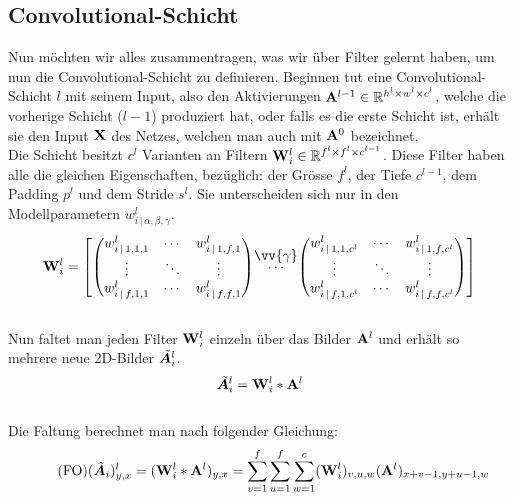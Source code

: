 \subsection{Convolutional-Schicht}
Nun möchten wir alles zusammentragen, was wir über Filter gelernt
haben, um nun die Convolutional-Schicht zu definieren.
\para{}
Beginnen tut eine Convolutional-Schicht $l$ mit seinem Input, also den
Aktivierungen $\mathbf{A}^{l-1} \in \mathbb{R}^{h^l \times w^l \times c^l}$, welche die vorherige Schicht ($l-1$) produziert hat,
oder falls es die erste Schicht ist, erhält sie den Input $\mathbf{X}$ des Netzes,
welchen man auch mit $\mathbf{A}^0$ bezeichnet. \\
Die Schicht besitzt $c^l$ Varianten an Filtern $\mathbf{W}^l_i \in
\mathbb{R}^{f^l \times f^l \times c^{l-1}}$. Diese Filter haben alle die gleichen
Eigenschaften, bezüglich: der Grösse $f^l$, der Tiefe $c^{l-1}$, dem Padding
$p^l$ und dem Stride $s^l$. Sie unterscheiden sich nur in den Modellparametern
$w^l_{i\,|\,\alpha,\beta,\gamma}$.
\\
\begin{equation*}
  \ten{W}^l_i =
  \begin{bmatrix}
    \begin{pmatrix}
      w_{i\,|\,1,1,1}^l & \cdots & w_{i\,|\,1,f,1}^l \\
      \vdots & \ddots & \vdots \\
      w_{i\,|\,f,1,1}^l & \cdots & w_{i\,|\,f,f,1}^l
    \end{pmatrix}
    & \stackrel{\mathclap{\normalfont\mbox{$\vv{\gamma}$}}}{\cdots} &
    \begin{pmatrix}
      w_{i\,|\,1,1,c^l}^l & \cdots & w_{i\,|\,1,f,c^l}^l \\
      \vdots & \ddots & \vdots \\
      w_{i\,|\,f,1,c^l}^l & \cdots & w_{i\,|\,f,f,c^l}^l
    \end{pmatrix}
  \end{bmatrix}
\end{equation*}
\\
Nun faltet man jeden Filter $\mathbf{W}_i^l$ einzeln über das Bilder
$\mathbf{A}^l$ und erhält so mehrere neue 2D-Bilder $\tilde{\bm{A}}_i^l$.
\\
\begin{equation}
  \tilde{\bm{A}}_i^l = \mathbf{W}_i^l * \mathbf{A}^l
\end{equation}
\\
Die Faltung berechnet man nach folgender Gleichung:
\\
\begin{equation}\tag{FO}
  (\tilde{\bm{A}}_i)_{y,x}^l = (\mathbf{W}_i^l * \mathbf{A}^l)_{y,x} = \sum_{v=1}^{f} \sum_{u=1}^{f} \sum_{w=1}^c (\mathbf{W}^l_i)_{v,u,w} (\mathbf{A}^l)_{x+v-1,y+u-1,w}
\end{equation}
